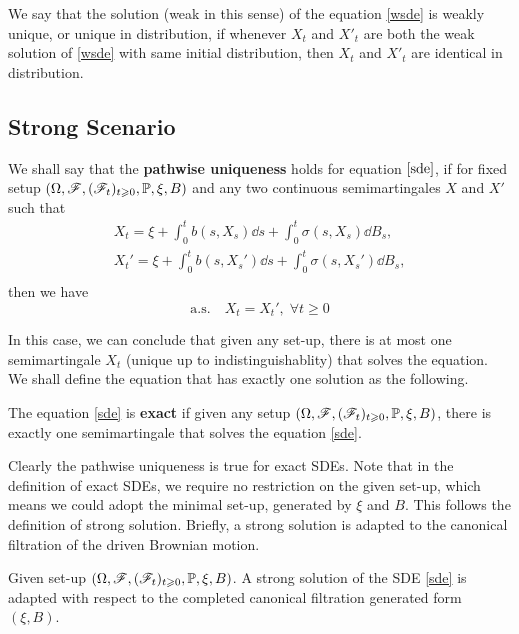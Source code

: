 \documentclass[8pt,onesided]{article}
\begin{document}
\begin{definition}
 We say that the solution (weak in this sense) of the equation \ref{wsde} is weakly unique, or unique in distribution, if whenever $X_t$ and $X'_t$ are both the weak solution of \ref{wsde} with same initial distribution, then $X_t$ and $X'_t$ are identical in distribution.
\end{definition}

\subsection{Strong Scenario}

\begin{definition}
 We shall say that the \textbf{pathwise uniqueness} holds for equation $\ref{sde}$, if for fixed setup $(\Omega, \mathscr{F} ,(\mathscr{F}_t)_{t\geqslant 0},\mathbb{P}, \xi, B)$ and any two continuous semimartingales $X$ and $X'$ such that
\begin{align*}
X_t=\xi+\int_0^t b(s,X_s)\dd s+\int_0^t \sigma(s, X_s)\dd B_s,\\
X_t'=\xi+\int_0^t b(s,X_s')\dd s+\int_0^t \sigma(s, X_s')\dd B_s,\\
\end{align*}
then we have
\begin{equation*}
    \text{a.s.}\quad  X_t=X_t', \; \forall t\ge 0
\end{equation*}
\end{definition}

In this case, we can conclude that given any set-up, there is at most one semimartingale $X_t$ (unique up to indistinguishablity) that solves the equation. We shall define the equation that has exactly one solution as the following.

\begin{definition}
 The equation \ref{sde} is \textbf{exact} if given any setup $(\Omega, \mathscr{F} ,(\mathscr{F}_t)_{t\geqslant 0},\mathbb{P}, \xi, B)$, there is exactly one semimartingale that solves the equation \ref{sde}. 
\end{definition}

Clearly the pathwise uniqueness is true for exact SDEs. Note that in the definition of exact SDEs, we require no restriction on the given set-up, which means we could adopt the minimal set-up, generated by $\xi$ and $B$. This follows the definition of strong solution. Briefly, a strong solution is adapted to the canonical filtration of the driven Brownian motion. 

\begin{definition}
Given set-up $(\Omega, \mathscr{F} ,(\mathscr{F}_t)_{t\geqslant 0},\mathbb{P}, \xi, B)$. A strong solution of the SDE \ref{sde} is adapted with respect to the completed canonical filtration generated form $(\xi,B)$.
\end{definition}
\end{document}
